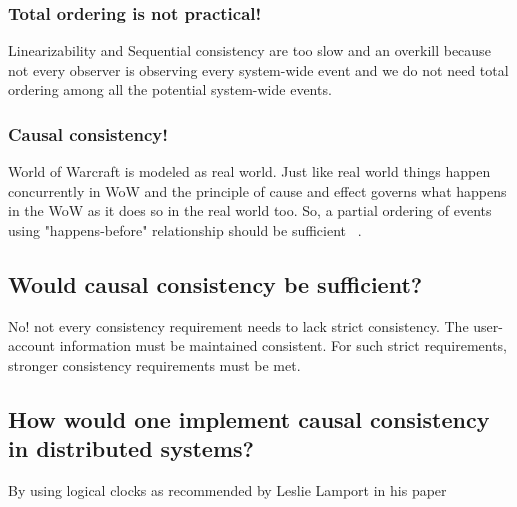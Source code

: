 \documentclass[11pt]{article} %
\begin{document}
\subsubsection{Total ordering is not practical!}
Linearizability and Sequential consistency are too slow and an overkill because not every observer is observing every system-wide event and we do not need total ordering among all the potential system-wide events.

\subsubsection{Causal consistency!}
World of Warcraft is modeled as real world. Just like real world things happen concurrently in WoW and the principle of cause and effect governs what happens in the WoW as it does so in the real world too. So, a partial ordering of events using "happens-before" relationship should be sufficient ~\cite{lamport1978time}. 

\subsection{Would causal consistency be sufficient?}
No! not every consistency requirement needs to lack strict consistency. The user-account information must be maintained consistent. For such strict requirements, stronger consistency requirements must be met.

\subsection{How would one implement causal consistency in distributed systems?}
By using logical clocks as recommended by Leslie Lamport in his paper ~\cite{lamport1978time}

{}

\end{document}
